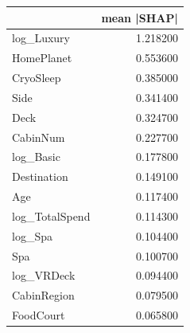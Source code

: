 \begin{tabular}{lr}
\toprule
 & mean |SHAP| \\
\midrule
log_Luxury & 1.218200 \\
HomePlanet & 0.553600 \\
CryoSleep & 0.385000 \\
Side & 0.341400 \\
Deck & 0.324700 \\
CabinNum & 0.227700 \\
log_Basic & 0.177800 \\
Destination & 0.149100 \\
Age & 0.117400 \\
log_TotalSpend & 0.114300 \\
log_Spa & 0.104400 \\
Spa & 0.100700 \\
log_VRDeck & 0.094400 \\
CabinRegion & 0.079500 \\
FoodCourt & 0.065800 \\
\bottomrule
\end{tabular}
